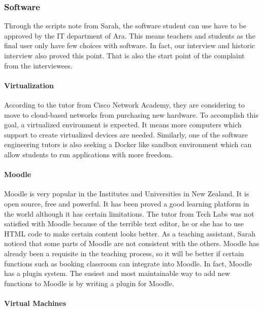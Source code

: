 \subsubsection{Software} 

Through the scripts note from Sarah, the software student can use have to be approved by the IT department of Ara. This means teachers and students as the final user only have few choices with software. In fact, our interview and historic interview also proved this point. That is also the start point of the complaint from the interviewees. 

\paragraph{Virtualization}

According to the tutor from Cisco Network Academy, they are considering to move to cloud-based networks from purchasing new hardware. To accomplish this goal, a virtualized environment is expected. It means more computers which support to create virtualized devices are needed. Similarly, one of the software engineering tutors is also seeking a Docker like sandbox environment which can allow students to run applications with more freedom. 

\paragraph{Moodle}

Moodle is very popular in the Institutes and Universities in New Zealand. It is open source, free and powerful. It has been proved a good learning platform in the world although it has certain limitations. The tutor from Tech Labs was not satisfied with Moodle because of the terrible text editor, he or she has to use HTML code to make certain content looks better. As a teaching assistant, Sarah noticed that some parts of Moodle 
are not consistent with the others. Moodle has already been a requisite in the teaching process, so it will be better if certain functions such as booking classroom can integrate into Moodle. In fact, Moodle has a plugin system. The easiest and most maintainable way to add new functions to Moodle is by writing a plugin for Moodle.

\paragraph{Virtual Machines}

